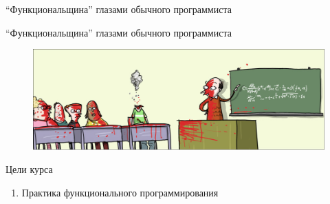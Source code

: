 \documentclass{beamer}
\begin{document}
\begin{frame}{``Функциональщина'' глазами обычного программиста}
  
\end{frame}

\begin{frame}{``Функциональщина'' глазами обычного программиста}
\begin{figure}
   \includegraphics[scale=0.44]{lecture0/Matematik-Hjerne-Formel-WM_strip_DK_20090625.eps}
\end{figure}
\end{frame}

\begin{frame}{Цели курса}
  \begin{enumerate}
  \item Практика функционального программирования
  \end{enumerate}
\end{frame}
\end{document}
